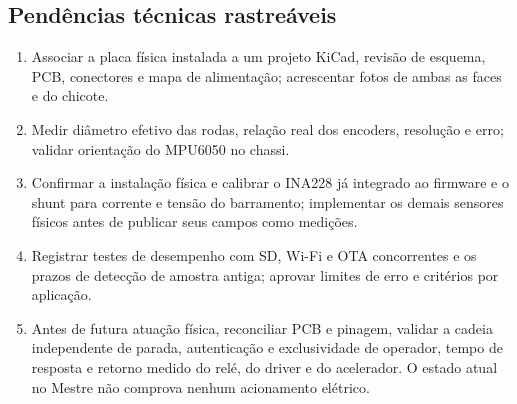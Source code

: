 \subsection{Pendências técnicas rastreáveis}
\begin{enumerate}
\item Associar a placa física instalada a um projeto KiCad, revisão de esquema, PCB, conectores e mapa de alimentação; acrescentar fotos de ambas as faces e do chicote.
\item Medir diâmetro efetivo das rodas, relação real dos encoders, resolução e erro; validar orientação do MPU6050 no chassi.
\item Confirmar a instalação física e calibrar o INA228 já integrado ao firmware e o shunt para corrente e tensão do barramento; implementar os demais sensores físicos antes de publicar seus campos como medições.
\item Registrar testes de desempenho com SD, Wi-Fi e OTA concorrentes e os prazos de detecção de amostra antiga; aprovar limites de erro e critérios por aplicação.
\item Antes de futura atuação física, reconciliar PCB e pinagem, validar a cadeia independente de parada, autenticação e exclusividade de operador, tempo de resposta e retorno medido do relé, do driver e do acelerador. O estado atual no Mestre não comprova nenhum acionamento elétrico.
\end{enumerate}
